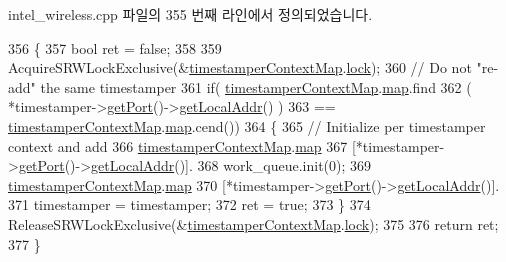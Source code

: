 intel\+\_\+wireless.\+cpp 파일의 355 번째 라인에서 정의되었습니다.


\begin{DoxyCode}
356 \{
357     \textcolor{keywordtype}{bool} ret = \textcolor{keyword}{false};
358 
359     AcquireSRWLockExclusive(&\hyperlink{intel__wireless_8cpp_a6308a285d09ed3d9d4a00645a386adad}{timestamperContextMap}.\hyperlink{class_locked_timestamper_context_map_afed18a2dbad108768defb51810a7a760}{lock});
360     \textcolor{comment}{// Do not "re-add" the same timestamper}
361     \textcolor{keywordflow}{if}( \hyperlink{intel__wireless_8cpp_a6308a285d09ed3d9d4a00645a386adad}{timestamperContextMap}.\hyperlink{class_locked_timestamper_context_map_a8880e18111e491249278c4cebf453b97}{map}.find
362         ( *timestamper->\hyperlink{class_wireless_timestamper_aad42db1d6ccc40f2bebc5ba544d738d8}{getPort}()->\hyperlink{class_common_port_ab6607250666be12220407c6c12671f65}{getLocalAddr}() )
363         == \hyperlink{intel__wireless_8cpp_a6308a285d09ed3d9d4a00645a386adad}{timestamperContextMap}.\hyperlink{class_locked_timestamper_context_map_a8880e18111e491249278c4cebf453b97}{map}.cend())
364     \{
365         \textcolor{comment}{// Initialize per timestamper context and add}
366         \hyperlink{intel__wireless_8cpp_a6308a285d09ed3d9d4a00645a386adad}{timestamperContextMap}.\hyperlink{class_locked_timestamper_context_map_a8880e18111e491249278c4cebf453b97}{map}
367             [*timestamper->\hyperlink{class_wireless_timestamper_aad42db1d6ccc40f2bebc5ba544d738d8}{getPort}()->\hyperlink{class_common_port_ab6607250666be12220407c6c12671f65}{getLocalAddr}()].
368             work\_queue.init(0);
369         \hyperlink{intel__wireless_8cpp_a6308a285d09ed3d9d4a00645a386adad}{timestamperContextMap}.\hyperlink{class_locked_timestamper_context_map_a8880e18111e491249278c4cebf453b97}{map}
370             [*timestamper->\hyperlink{class_wireless_timestamper_aad42db1d6ccc40f2bebc5ba544d738d8}{getPort}()->\hyperlink{class_common_port_ab6607250666be12220407c6c12671f65}{getLocalAddr}()].
371             timestamper = timestamper;
372         ret = \textcolor{keyword}{true};
373     \}
374     ReleaseSRWLockExclusive(&\hyperlink{intel__wireless_8cpp_a6308a285d09ed3d9d4a00645a386adad}{timestamperContextMap}.\hyperlink{class_locked_timestamper_context_map_afed18a2dbad108768defb51810a7a760}{lock});
375 
376     \textcolor{keywordflow}{return} ret;
377 \}
\end{DoxyCode}


